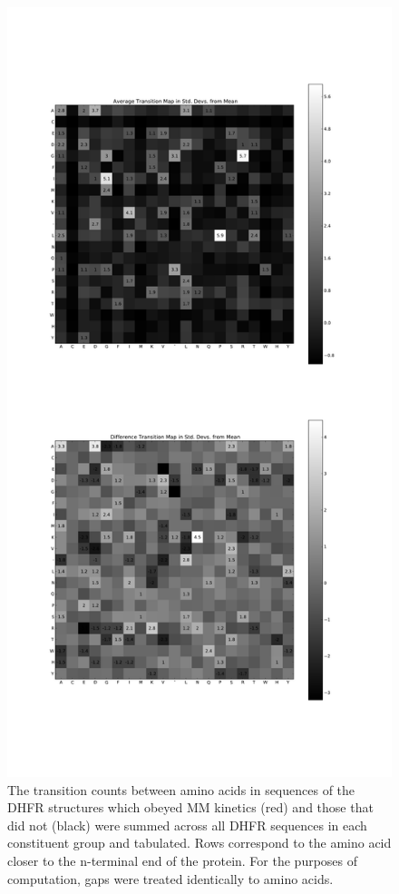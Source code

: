 \documentclass[a4paper,11pt]{article}
\begin{document}
\begin{figure}
\centerline{\includegraphics[width=8in]{transitions.pdf}}
\caption[Amino Acid Transition Matrix]{The transition counts between amino acids in sequences of the DHFR structures which obeyed MM kinetics (red) and those that did not (black) were summed across all DHFR sequences in each constituent group and tabulated. Rows correspond to the amino acid closer to the n-terminal end of the protein. For the purposes of computation, gaps were treated identically to amino acids.}
\end{figure}
\end{document}
